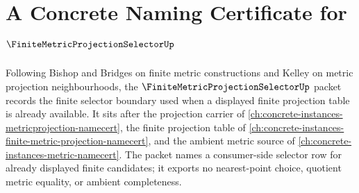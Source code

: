 \chapter{A Concrete Naming Certificate for $\FiniteMetricProjectionSelectorUp$}
\label{ch:concrete-instances-finite-metric-projection-selector-namecert}

Following Bishop and Bridges on finite metric constructions and Kelley on metric projection neighbourhoods, the $\FiniteMetricProjectionSelectorUp$ packet records the finite selector boundary used when a displayed finite projection table is already available. It sits after the projection carrier of \autoref{ch:concrete-instances-metricprojection-namecert}, the finite projection table of \autoref{ch:concrete-instances-finite-metric-projection-namecert}, and the ambient metric source of \autoref{ch:concrete-instances-metric-namecert}. The packet names a consumer-side selector row for already displayed finite candidates; it exports no nearest-point choice, quotient metric equality, or ambient completeness.

